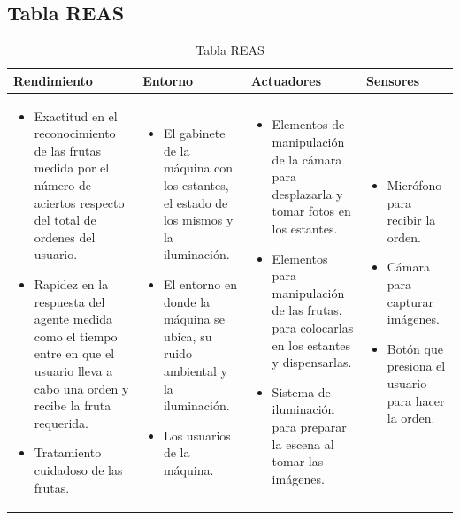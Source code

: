 \documentclass[a4paper, 12pt]{article}
\begin{document}
\subsection{Tabla REAS}
\begin{table}[htbp]
    \centering
    \begin{tabular}{|p{3.5cm}|p{3.5cm}|p{3.5cm}|p{3.5cm}|}
        \hline
        \textbf{Rendimiento} & \textbf{Entorno} & \textbf{Actuadores} & \textbf{Sensores} \\
        \hline
        \begin{itemize}[left=0pt, itemsep=-2pt]
            \item Exactitud en el reconocimiento de las frutas medida por el número de aciertos respecto del total de ordenes del usuario.
            \item Rapidez en la respuesta del agente medida como el tiempo entre en que el usuario lleva a cabo una orden y recibe la fruta requerida.
            \item Tratamiento cuidadoso de las frutas.
        \end{itemize} & 
        \begin{itemize}[left=0pt, itemsep=-2pt]
            \item El gabinete de la máquina con los estantes, el estado de los mismos y la iluminación.
            \item El entorno en donde la máquina se ubica, su ruido ambiental y la iluminación.
            \item Los usuarios de la máquina.
        \end{itemize} & 
        \begin{itemize}[left=0pt, itemsep=-2pt]
            \item Elementos de manipulación de la cámara para desplazarla y tomar fotos en los estantes.
            \item Elementos para manipulación de las frutas, para colocarlas en los estantes y dispensarlas.
            \item Sistema de iluminación para preparar la escena al tomar las imágenes.
        \end{itemize} & 
        \begin{itemize}[left=0pt]
            \item Micrófono para recibir la orden.
            \item Cámara para capturar imágenes.
            \item Botón que presiona el usuario para hacer la orden.
        \end{itemize} \\
        \hline
    \end{tabular}
    \caption{Tabla REAS}
    \label{tabla:ejemplo}
\end{table}
\end{document}
